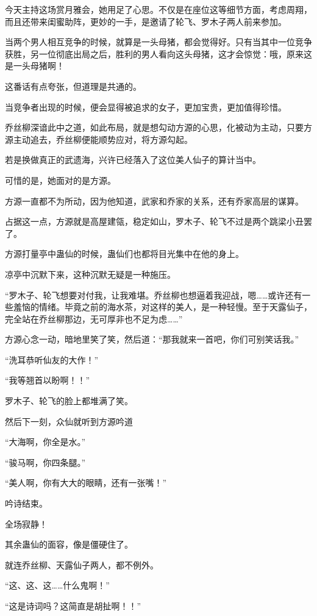 \begin{this_body}
今天主持这场赏月雅会，她用足了心思。不仅是在座位这等细节方面，考虑周翔，而且还带来闺蜜助阵，更妙的一手，是邀请了轮飞、罗木子两人前来参加。

当两个男人相互竞争的时候，就算是一头母猪，都会觉得好。只有当其中一位竞争获胜，另一位彻底出局之后，胜利的男人看向这头母猪，这才会惊觉：哦，原来这是一头母猪啊！

这番话有点夸张，但道理是共通的。

当竞争者出现的时候，便会显得被追求的女子，更加宝贵，更加值得珍惜。

乔丝柳深谙此中之道，如此布局，就是想勾动方源的心思，化被动为主动，只要方源主动追去，乔丝柳便能顺势应对，将方源勾起。

若是换做真正的武遗海，兴许已经落入了这位美人仙子的算计当中。

可惜的是，她面对的是方源。

方源一直都不为所动，因为他知道，武家和乔家的关系，还有乔家高层的谋算。

占据这一点，方源就是高屋建瓴，稳定如山，罗木子、轮飞不过是两个跳梁小丑罢了。

方源打量亭中蛊仙的时候，蛊仙们也都将目光集中在他的身上。

凉亭中沉默下来，这种沉默无疑是一种施压。

“罗木子、轮飞想要对付我，让我难堪。乔丝柳也想逼着我迎战，嗯……或许还有一些羞恼的情绪。毕竟之前的海水茶，对这样的美人，是一种轻慢。至于天露仙子，完全站在乔丝柳那边，无可厚非也不足为虑……”

方源心念一动，暗地里笑了笑，然后道：“那我就来一首吧，你们可别笑话我。”

“洗耳恭听仙友的大作！”

“我等翘首以盼啊！！”

罗木子、轮飞的脸上都堆满了笑。

然后下一刻，众仙就听到方源吟道

“大海啊，你全是水。”

“骏马啊，你四条腿。”

“美人啊，你有大大的眼睛，还有一张嘴！”

吟诗结束。

全场寂静！

其余蛊仙的面容，像是僵硬住了。

就连乔丝柳、天露仙子两人，都不例外。

“这、这、这……什么鬼啊！”

“这是诗词吗？这简直是胡扯啊！！”


\end{this_body}
